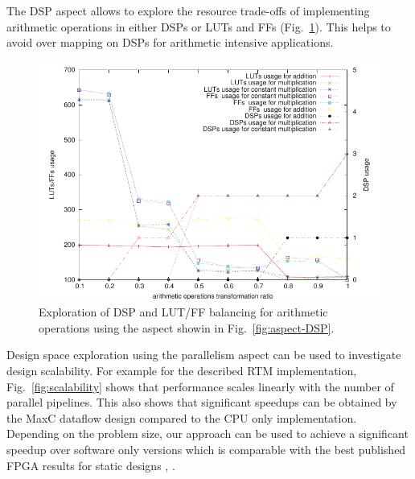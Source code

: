 The DSP aspect allows to explore the resource trade-offs of
implementing arithmetic operations in either DSPs or LUTs and FFs
(Fig.~\ref{fig:arith}). This helps to avoid over mapping on DSPs for
arithmetic intensive applications.

\begin{figure}[!h]
\includegraphics[scale=0.7]{figs/arith}
\caption{Exploration of DSP and LUT/FF balancing for arithmetic
  operations using the aspect showin in Fig.~\ref{fig:aspect-DSP}.}
\label{fig:arith}
\end{figure}

Design space exploration using the parallelism aspect can be used to
investigate design scalability. For example for the described RTM
implementation, Fig.~\ref{fig:scalability} shows that performance
scales linearly with the number of parallel pipelines. This also shows
that significant speedups can be obtained by the MaxC dataflow design
compared to the CPU only implementation. Depending on the problem
size, our approach can be used to achieve a significant speedup over
software only versions which is comparable with the best published
FPGA results for static designs
\cite{Xinyu:Qiwei:Luk:Qiang:Pell:2012}, \cite{araya2011assessing}.



